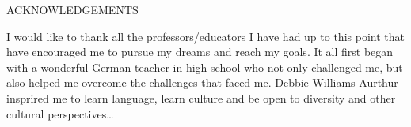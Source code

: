 \documentclass[
12pt, %
english, %
doublespacing, %
nolistspacing, %
liststotoc, %
headsepline, %
chapterinoneline, %
openany, %
]{DoctoralThesis}\usepackage[]{graphicx}\usepackage[]{color}
\begin{document}


%






\begin{center}
\MakeUppercase{Acknowledgements}\\ \bigskip
\end{center}

I would like to thank all the professors/educators I have had up to this point that have encouraged me to pursue my dreams and reach my goals. It all first began with a wonderful German teacher in high school who not only challenged me, but also helped me overcome the challenges that faced me. Debbie Williams-Aurthur insprired me to learn language, learn culture and be open to diversity and other cultural perspectives\ldots


%


%
%
\end{document}
